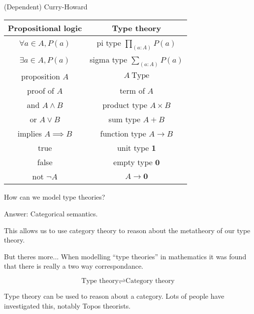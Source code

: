 \documentclass[usenames,dvipsnames]{beamer}
\begin{document}
    
    \begin{frame}{(Dependent) Curry-Howard}
        \begin{table}
            \begin{tabular}{c || c}
                \textbf{Propositional logic} & \textbf{Type theory} \\
                \hline\hline
                $\forall a \in A, P(a)$ & pi type $\prod_{(a : A)}P(a)$     \\
                $\exists a \in A, P(a)$ & sigma type $\sum_{(a:A)}P(a)$     \\
                proposition $A$         & $A\ \text{Type}$                  \\
                proof of $A$            & term of $A$                       \\
                and $A \land B$         & product type $A \times B$         \\
                or $A \lor B$           & sum type $A + B$                  \\
                implies $A \implies B$  & function type $A \to B$           \\
                true                    & unit type $\mathbf{1}$            \\
                false                   & empty type $\mathbf{0}$           \\
                not $¬A$                & $A \to \mathbf{0}$                \\
            \end{tabular}
        \end{table}
    \end{frame}
    
    \begin{frame}{How can we model type theories?}
        \begin{block}{Answer:}
            Categorical semantics.
        \end{block}
        This allows us to use category theory to reason about the metatheory of our type theory.
        
        \begin{block}{But theres more...}
            When modelling ``type theories'' in mathematics it was found that there is really a two way correspondance.
            
            $$\text{Type theory} \rightleftharpoons \text{Category theory}$$
            
            Type theory can be used to reason about a category. Lots of people have investigated this, notably Topos theorists.
        \end{block}
        
    \end{frame}
    
\end{document}
